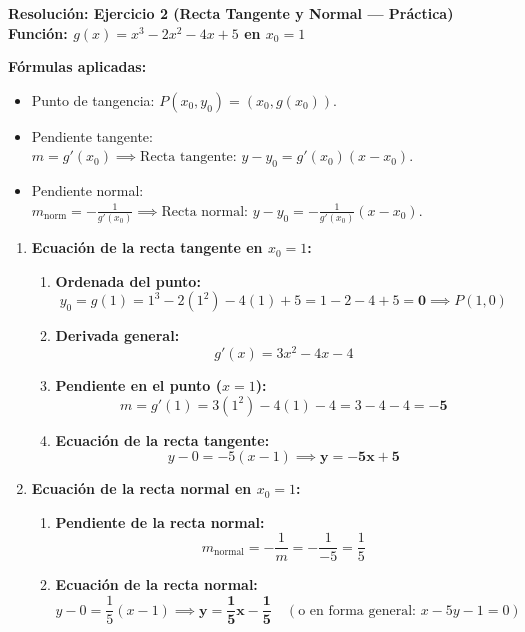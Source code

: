 ﻿\documentclass[11pt,a4paper]{article}
\begin{document}
\newpage

\begin{center}
    {\LARGE \textbf{Resolución: Ejercicio 2 (Recta Tangente y Normal — Práctica)}}\\[4pt]
    {\large \textbf{Función: $g(x) = x^3 - 2x^2 - 4x + 5$ en $x_0 = 1$}}
\end{center}

\vspace{0.3cm}
\begin{tcolorbox}
\textbf{Fórmulas aplicadas:}
\begin{itemize}[leftmargin=1.5em, itemsep=2pt]
    \item Punto de tangencia: $P(x_0, y_0) = (x_0, g(x_0))$.
    \item Pendiente tangente: $m = g'(x_0) \implies \text{Recta tangente: } y - y_0 = g'(x_0)(x - x_0)$.
    \item Pendiente normal: $m_{\text{norm}} = -\frac{1}{g'(x_0)} \implies \text{Recta normal: } y - y_0 = -\frac{1}{g'(x_0)}(x - x_0)$.
\end{itemize}
\end{tcolorbox}

\vspace{0.2cm}
\begin{enumerate}[label=\textbf{\alph*)}, leftmargin=2em, itemsep=8pt]
    \item \textbf{Ecuación de la recta tangente en $x_0 = 1$:}
    \begin{enumerate}[label=\arabic*., leftmargin=1.5em, itemsep=2pt]
        \item \textbf{Ordenada del punto:}
        \[
        y_0 = g(1) = 1^3 - 2(1^2) - 4(1) + 5 = 1 - 2 - 4 + 5 = \mathbf{0} \implies P(1, 0)
        \]
        \item \textbf{Derivada general:}
        \[
        g'(x) = 3x^2 - 4x - 4
        \]
        \item \textbf{Pendiente en el punto ($x = 1$):}
        \[
        m = g'(1) = 3(1^2) - 4(1) - 4 = 3 - 4 - 4 = \mathbf{-5}
        \]
        \item \textbf{Ecuación de la recta tangente:}
        \[
        y - 0 = -5(x - 1) \implies \mathbf{y = -5x + 5}
        \]
    \end{enumerate}

    \item \textbf{Ecuación de la recta normal en $x_0 = 1$:}
    \begin{enumerate}[label=\arabic*., leftmargin=1.5em, itemsep=2pt]
        \item \textbf{Pendiente de la recta normal:}
        \[
        m_{\text{normal}} = -\frac{1}{m} = -\frac{1}{-5} = \frac{1}{5}
        \]
        \item \textbf{Ecuación de la recta normal:}
        \[
        y - 0 = \frac{1}{5}(x - 1) \implies \mathbf{y = \frac{1}{5}x - \frac{1}{5}} \quad (\text{o en forma general: } x - 5y - 1 = 0)
        \]
    \end{enumerate}
\end{enumerate}
\end{document}
